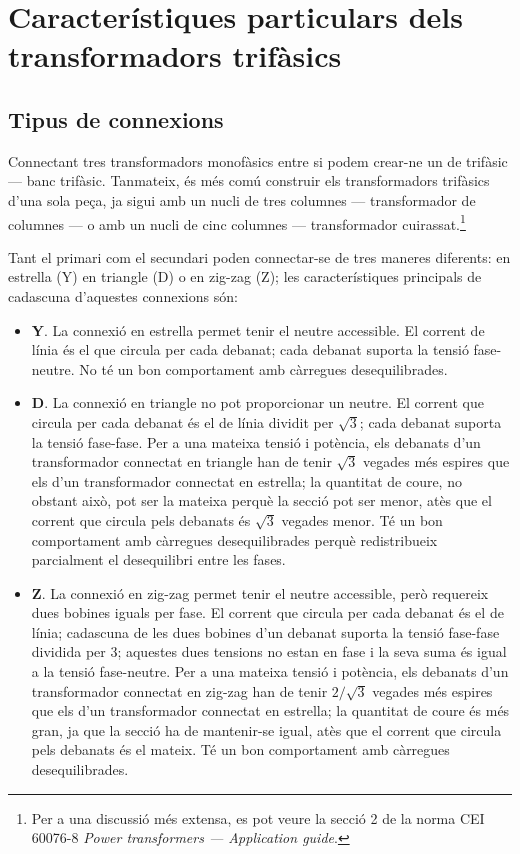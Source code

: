 \section{Característiques particulars  dels transformadors trifàsics}\label{sec:caract-trans-trif}

\subsection{Tipus de connexions}


Connectant tres transformadors monofàsics entre si podem crear-ne un de trifàsic --- banc trifàsic. Tanmateix, és més comú construir els transformadors trifàsics d'una sola peça, ja sigui amb un nucli de tres columnes --- transformador de columnes --- o amb un nucli de cinc columnes --- transformador cuirassat.\footnote{Per a una discussió més extensa, es pot veure la secció 2 de la norma CEI 60076-8 \emph{Power transformers --- Application guide}.}

Tant el primari com el secundari poden connectar-se de tres maneres diferents: en estrella (Y) en triangle (D) o en zig-zag (Z); les característiques principals de cadascuna d'aquestes connexions són:

\begin{itemize}
   \item \textbf{Y}. La connexió en estrella permet tenir el neutre accessible. El corrent de línia és el que circula per cada debanat; cada debanat suporta la tensió fase-neutre. No té un bon comportament amb càrregues desequilibrades.
   \item \textbf{D}. La connexió en triangle no pot proporcionar un neutre. El corrent que circula per cada debanat és el de línia dividit per $\sqrt{3}$; cada debanat suporta la tensió fase-fase. Per a una mateixa tensió i potència, els debanats d'un transformador connectat en triangle han de tenir $\sqrt{3}$ vegades més espires que els d'un transformador connectat en estrella; la quantitat de coure, no obstant això, pot ser la mateixa perquè la secció pot ser menor, atès que el corrent que circula pels debanats és $\sqrt{3}$ vegades menor. Té un bon comportament amb càrregues desequilibrades perquè redistribueix parcialment el desequilibri entre les fases.
   \item \textbf{Z}. La connexió en zig-zag permet tenir el neutre accessible, però requereix dues bobines iguals per fase. El corrent que circula per cada debanat és el de línia; cadascuna de les dues bobines d'un debanat suporta la tensió fase-fase dividida per 3; aquestes dues tensions no estan en fase i la seva suma és igual a la tensió fase-neutre. Per a una mateixa tensió i potència, els debanats d'un transformador connectat en zig-zag han de tenir $2/\sqrt{3}$ vegades més espires que els d'un transformador connectat en estrella; la quantitat de coure és més gran, ja que la secció ha de mantenir-se igual, atès que el corrent que circula pels debanats és el mateix. Té un bon comportament amb càrregues desequilibrades.
\end{itemize}

